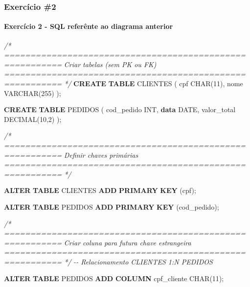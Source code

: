 \documentclass[
]{book}
\makeatletter
\newenvironment{Shaded}{\begin{snugshade}}{\end{snugshade}}
\newcommand{\CommentTok}[1]{\textcolor[rgb]{0.56,0.35,0.01}{\textit{#1}}}
\newcommand{\DataTypeTok}[1]{\textcolor[rgb]{0.13,0.29,0.53}{#1}}
\newcommand{\DecValTok}[1]{\textcolor[rgb]{0.00,0.00,0.81}{#1}}
\newcommand{\KeywordTok}[1]{\textcolor[rgb]{0.13,0.29,0.53}{\textbf{#1}}}
\newcommand{\NormalTok}[1]{#1}
\newcommand*\pandocbounded[1]{%
  \sbox\pandoc@box{#1}%
  \Gscale@div\@tempa{\textheight}{\dimexpr\ht\pandoc@box+\dp\pandoc@box\relax}%
  \Gscale@div\@tempb{\linewidth}{\wd\pandoc@box}%
  \ifdim\@tempb\p@<\@tempa\p@\let\@tempa\@tempb\fi%
  \ifdim\@tempa\p@<\p@\scalebox{\@tempa}{\usebox\pandoc@box}%
  \else\usebox{\pandoc@box}%
  \fi%
}
\makeatother
\begin{document}
\subsubsection{Exercício \#2}\label{exercuxedcio-2-1}

\pandocbounded{}

\paragraph{Exercício 2 - SQL referênte ao diagrama anterior}\label{exercuxedcio-2---sql-referuxeante-ao-diagrama-anterior-1}

\begin{Shaded}
\begin{Highlighting}[]
\CommentTok{/* =========================================================}
\CommentTok{   Criar tabelas (sem PK ou FK)}
\CommentTok{   ========================================================= */}
\KeywordTok{CREATE} \KeywordTok{TABLE}\NormalTok{ CLIENTES }
\NormalTok{(}
\NormalTok{    cpf }\DataTypeTok{CHAR}\NormalTok{(}\DecValTok{11}\NormalTok{),}
\NormalTok{    nome }\DataTypeTok{VARCHAR}\NormalTok{(}\DecValTok{255}\NormalTok{)}
\NormalTok{);}

\KeywordTok{CREATE} \KeywordTok{TABLE}\NormalTok{ PEDIDOS }
\NormalTok{(}
\NormalTok{    cod\_pedido }\DataTypeTok{INT}\NormalTok{,}
    \KeywordTok{data} \DataTypeTok{DATE}\NormalTok{,}
\NormalTok{    valor\_total }\DataTypeTok{DECIMAL}\NormalTok{(}\DecValTok{10}\NormalTok{,}\DecValTok{2}\NormalTok{)}
\NormalTok{);}

\CommentTok{/* =========================================================}
\CommentTok{   Definir chaves primárias}
\CommentTok{   ========================================================= */}

\KeywordTok{ALTER} \KeywordTok{TABLE}\NormalTok{ CLIENTES  }\KeywordTok{ADD} \KeywordTok{PRIMARY} \KeywordTok{KEY}\NormalTok{ (cpf);}

\KeywordTok{ALTER} \KeywordTok{TABLE}\NormalTok{ PEDIDOS   }\KeywordTok{ADD} \KeywordTok{PRIMARY} \KeywordTok{KEY}\NormalTok{ (cod\_pedido);}

\CommentTok{/* =========================================================}
\CommentTok{   Criar coluna para futura chave estrangeira}
\CommentTok{   ========================================================= */}
\CommentTok{{-}{-} Relacionamento CLIENTES 1:N PEDIDOS }

\KeywordTok{ALTER} \KeywordTok{TABLE}\NormalTok{ PEDIDOS }\KeywordTok{ADD} \KeywordTok{COLUMN}\NormalTok{ cpf\_cliente }\DataTypeTok{CHAR}\NormalTok{(}\DecValTok{11}\NormalTok{);}


\end{Highlighting}
\end{Shaded}
\end{document}
